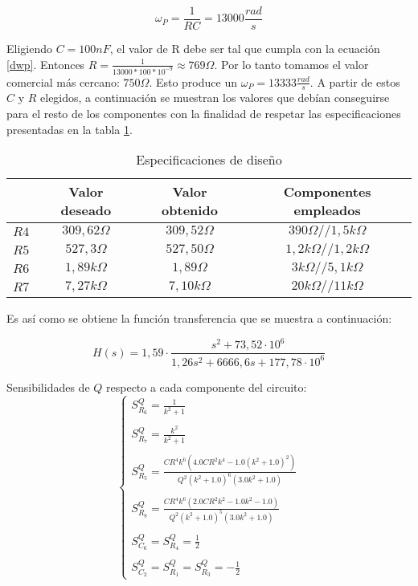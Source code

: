 \begin{equation}
	\omega_P = \frac{1}{RC} = 13000\frac{rad}{s}
	\label{dwp}
\end{equation}

Eligiendo $C = 100nF$, el valor de R debe ser tal que cumpla con la ecuaci\'on \ref{dwp}. Entonces $R = \frac{1}{13000 * 100 *10^{-9}} \approx 769\Omega.$ Por lo tanto tomamos el valor comercial m\'as cercano: $750\Omega$. Esto produce un $\omega_P = 13333 \frac{rad}{s}$. A partir de estos $C$ y $R$ elegidos, a continuaci\'on se muestran los valores que deb\'ian conseguirse para el resto de los componentes con la finalidad de respetar las especificaciones presentadas en la tabla \ref{especificaciones}.

\begin{table}[H]
	\centering
	\begin{tabular}{c c c c}%
		\bfseries  & Valor deseado & Valor obtenido& Componentes empleados \\ \hline
		$R4$ & $309,62\Omega$  & $309,52\Omega$ & $390\Omega // 1,5k\Omega$\\
			$R5$ & $527,3\Omega$  & $527,50\Omega$ & $1,2k\Omega // 1,2k\Omega$\\
				$R6$ & $1,89k\Omega$  & $1,89\Omega$ & $3k\Omega // 5,1k\Omega$\\
				$R7$ & $7,27k\Omega$  & $7,10k\Omega$ & $20k\Omega // 11k\Omega$\\
		\hline
	\end{tabular}
	\caption{Especificaciones de dise\~no}
	\label{especificaciones}
\end{table}

Es as\'i como se obtiene la funci\'on transferencia que se muestra a continuaci\'on:

\begin{equation}
H(s) = 1,59 \cdot \frac{s^2+73,52 \cdot 10^6}{1,26 s^2 + 6666,6 s + 177,78 \cdot 10^6}
\label{vovi_val}
\end{equation}

Sensibilidades de $Q$ respecto a cada componente del circuito:
\begin{equation}
\begin{cases}
S^{Q}_{R_6} = \frac{1}{k^{2} + 1}\\ \\
S^{Q}_{R_7} = \frac{k^{2}}{k^{2} + 1}\\ \\
S^{Q}_{R_5} =\frac{C R^{4} k^{6} \left(4.0 C R^{2} k^{4} - 1.0 \left(k^{2} + 1.0\right)^{2}\right)}{Q^{2} \left(k^{2} + 1.0\right)^{6} \left(3.0 k^{2} + 1.0\right)}
 \\ \\
S^{Q}_{R_8} = \frac{C R^{4} k^{6} \left(2.0 C R^{2} k^{2} - 1.0 k^{2} - 1.0\right)}{Q^{2} \left(k^{2} + 1.0\right)^{5} \left(3.0 k^{2} + 1.0\right)}
\\ \\
S^{Q}_{C_6} = S^{Q}_{R_4} =\frac{1}{2} \\ \\
S^{Q}_{C_2} = S^{Q}_{R_1} = S^{Q}_{R_3} =-\frac{1}{2}
\end{cases}
\label{componentes}
\end{equation}

